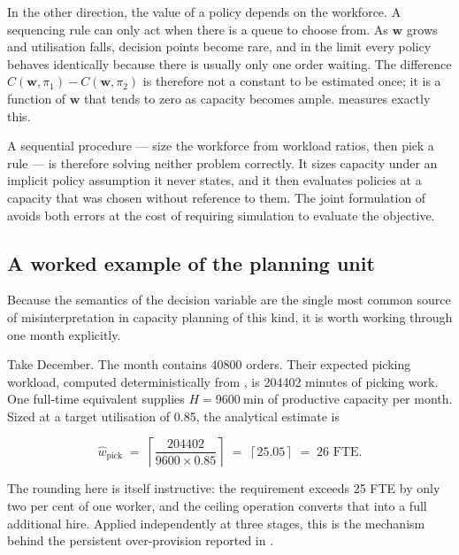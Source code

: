 In the other direction, the value of a policy depends on the workforce. A sequencing rule can
only act when there is a queue to choose from. As \(\mathbf{w}\) grows and utilisation falls,
decision points become rare, and in the limit every policy behaves identically because there is
usually only one order waiting. The difference \(C(\mathbf{w}, \pi_1) - C(\mathbf{w}, \pi_2)\)
is therefore not a constant to be estimated once; it is a function of \(\mathbf{w}\) that tends
to zero as capacity becomes ample.  measures exactly this.

A sequential procedure --- size the workforce from workload ratios, then pick a rule --- is
therefore solving neither problem correctly. It sizes capacity under an implicit policy
assumption it never states, and it then evaluates policies at a capacity that was chosen
without reference to them. The joint formulation of  avoids both errors at the
cost of requiring simulation to evaluate the objective.

\subsection{A worked example of the planning unit}
\label{sec:worked-example}

Because the semantics of the decision variable are the single most common source of
misinterpretation in capacity planning of this kind, it is worth working through one month
explicitly.

Take December. The month contains \num{40800} orders. Their expected picking workload, computed
deterministically from , is \num{204402} minutes of
picking work. One full-time equivalent supplies \(H = \SI{9600}{\minute}\) of productive
capacity per month. Sized at a target utilisation of \num{0.85}, the analytical estimate is

\begin{equation*}
\hat{w}_{\text{pick}} \;=\; \left\lceil \frac{\num{204402}}{\num{9600} \times 0.85} \right\rceil
\;=\; \left\lceil 25.05 \right\rceil \;=\; 26 \text{ FTE}.
\end{equation*}

The rounding here is itself instructive: the requirement exceeds 25 FTE by only two per cent of
one worker, and the ceiling operation converts that into a full additional hire. Applied
independently at three stages, this is the mechanism behind the persistent over-provision
reported in .

